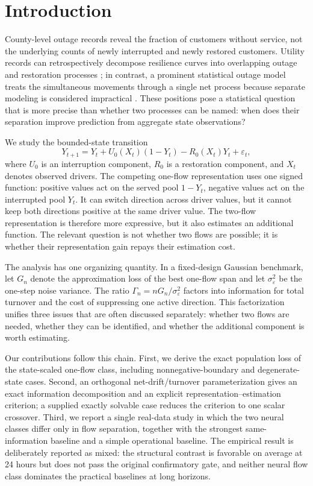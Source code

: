 \section{Introduction}

County-level outage records reveal the fraction of customers without service, not the underlying counts of newly interrupted and newly restored customers. Utility records can retrospectively decompose resilience curves into overlapping outage and restoration processes \citep{carrington2021}; in contrast, a prominent statistical outage model treats the simultaneous movements through a single net process because separate modeling is considered impractical \citep{zhu2021}. These positions pose a statistical question that is more precise than whether two processes can be named: when does their separation improve prediction from aggregate state observations?

We study the bounded-state transition
\begin{equation}
Y_{t+1}=Y_t+U_0(X_t)(1-Y_t)-R_0(X_t)Y_t+\varepsilon_t,
\label{eq:intro_transition}
\end{equation}
where $U_0$ is an interruption component, $R_0$ is a restoration component, and $X_t$ denotes observed drivers. The competing one-flow representation uses one signed function: positive values act on the served pool $1-Y_t$, negative values act on the interrupted pool $Y_t$. It can switch direction across driver values, but it cannot keep both directions positive at the same driver value. The two-flow representation is therefore more expressive, but it also estimates an additional function. The relevant question is not whether two flows are possible; it is whether their representation gain repays their estimation cost.

The analysis has one organizing quantity. In a fixed-design Gaussian benchmark, let $G_n$ denote the approximation loss of the best one-flow span and let $\sigma_\varepsilon^2$ be the one-step noise variance. The ratio $\Gamma_n=nG_n/\sigma_\varepsilon^2$ factors into information for total turnover and the cost of suppressing one active direction. This factorization unifies three issues that are often discussed separately: whether two flows are needed, whether they can be identified, and whether the additional component is worth estimating.

Our contributions follow this chain. First, we derive the exact population loss of the state-scaled one-flow class, including nonnegative-boundary and degenerate-state cases. Second, an orthogonal net-drift/turnover parameterization gives an exact information decomposition and an explicit representation--estimation criterion; a supplied exactly solvable case reduces the criterion to one scalar crossover. Third, we report a single real-data study in which the two neural classes differ only in flow separation, together with the strongest same-information baseline and a simple operational baseline. The empirical result is deliberately reported as mixed: the structural contrast is favorable on average at 24 hours but does not pass the original confirmatory gate, and neither neural flow class dominates the practical baselines at long horizons.

